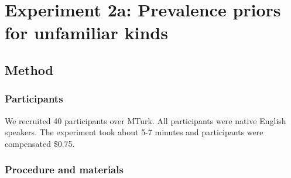 \documentclass[12pt,letterpaper]{article}
\begin{document}
\section*{Experiment 2a: Prevalence priors for unfamiliar kinds}

%

%
%
%

\subsection*{Method}

\subsubsection*{Participants}

We recruited 40 participants over MTurk.  
All participants were native English speakers. 
The experiment took about 5-7 minutes and participants were compensated \$0.75.

\subsubsection*{Procedure and materials}
\end{document}
